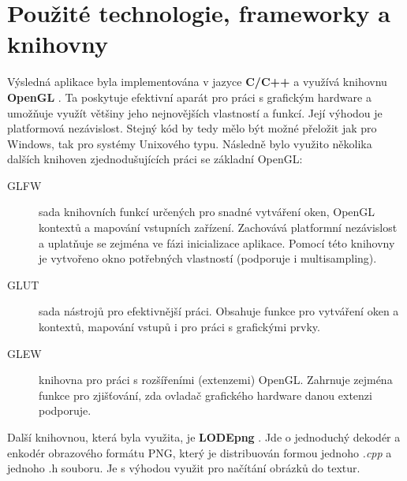 \section{Použité technologie, frameworky a knihovny}
\label{sec-frameworks}

Výsledná aplikace byla implementována v jazyce {\bf C/C++} a využívá knihovnu {\bf OpenGL} \cite{openGL}. Ta poskytuje efektivní aparát pro práci s grafickým hardware a umožňuje využít většiny jeho nejnovějších vlastností a funkcí. Její výhodou je platformová nezávislost. Stejný kód by tedy mělo být možné přeložit jak pro Windows, tak pro systémy Unixového typu. Následně bylo využito několika dalších knihoven zjednodušujících práci se základní OpenGL:
\begin{description}
\item[GLFW] \cite{GLFW} sada knihovních funkcí určených pro snadné vytváření oken, OpenGL kontextů a mapování vstupních zařízení. Zachovává platformní nezávislost a uplatňuje se zejména ve fázi inicializace aplikace. Pomocí této knihovny je vytvořeno okno potřebných vlastností (podporuje i multisampling).
\item[GLUT] \cite{GLUT} sada nástrojů pro efektivnější práci. Obsahuje funkce pro vytváření oken a kontextů, mapování vstupů i pro práci s grafickými prvky.
\item[GLEW] \cite{GLEW} knihovna pro práci s rozšířeními (extenzemi) OpenGL. Zahrnuje zejména funkce pro zjišťování, zda ovladač grafického hardware danou extenzi podporuje.
\end{description}
Další knihovnou, která byla využita, je {\bf LODEpng} \cite{LODEpng}. Jde o jednoduchý dekodér a enkodér obrazového formátu PNG, který je distribuován formou jednoho \emph{.cpp} a jednoho {.h} souboru. Je s výhodou využit pro načítání obrázků do textur.


